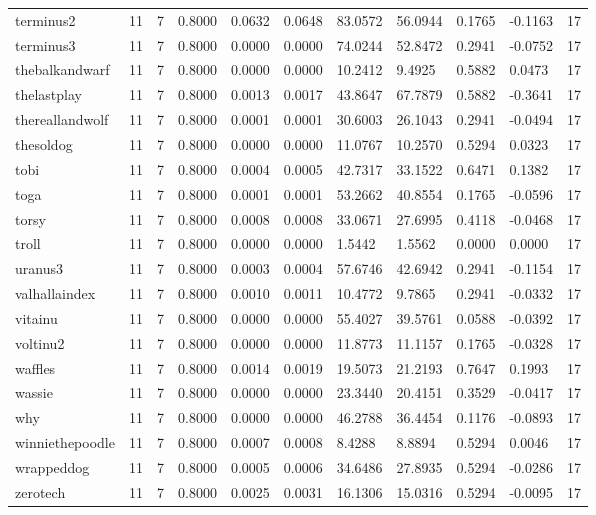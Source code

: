 \begin{table}[htbp]
\begin{tabular}{lllllllllll}
terminus2 & 11 & 7 & 0.8000 & 0.0632 & 0.0648 & 83.0572 & 56.0944 & 0.1765 & -0.1163 & 17 \\
terminus3 & 11 & 7 & 0.8000 & 0.0000 & 0.0000 & 74.0244 & 52.8472 & 0.2941 & -0.0752 & 17 \\
thebalkandwarf & 11 & 7 & 0.8000 & 0.0000 & 0.0000 & 10.2412 & 9.4925 & 0.5882 & 0.0473 & 17 \\
thelastplay & 11 & 7 & 0.8000 & 0.0013 & 0.0017 & 43.8647 & 67.7879 & 0.5882 & -0.3641 & 17 \\
thereallandwolf & 11 & 7 & 0.8000 & 0.0001 & 0.0001 & 30.6003 & 26.1043 & 0.2941 & -0.0494 & 17 \\
thesoldog & 11 & 7 & 0.8000 & 0.0000 & 0.0000 & 11.0767 & 10.2570 & 0.5294 & 0.0323 & 17 \\
tobi & 11 & 7 & 0.8000 & 0.0004 & 0.0005 & 42.7317 & 33.1522 & 0.6471 & 0.1382 & 17 \\
toga & 11 & 7 & 0.8000 & 0.0001 & 0.0001 & 53.2662 & 40.8554 & 0.1765 & -0.0596 & 17 \\
torsy & 11 & 7 & 0.8000 & 0.0008 & 0.0008 & 33.0671 & 27.6995 & 0.4118 & -0.0468 & 17 \\
troll & 11 & 7 & 0.8000 & 0.0000 & 0.0000 & 1.5442 & 1.5562 & 0.0000 & 0.0000 & 17 \\
uranus3 & 11 & 7 & 0.8000 & 0.0003 & 0.0004 & 57.6746 & 42.6942 & 0.2941 & -0.1154 & 17 \\
valhallaindex & 11 & 7 & 0.8000 & 0.0010 & 0.0011 & 10.4772 & 9.7865 & 0.2941 & -0.0332 & 17 \\
vitainu & 11 & 7 & 0.8000 & 0.0000 & 0.0000 & 55.4027 & 39.5761 & 0.0588 & -0.0392 & 17 \\
voltinu2 & 11 & 7 & 0.8000 & 0.0000 & 0.0000 & 11.8773 & 11.1157 & 0.1765 & -0.0328 & 17 \\
waffles & 11 & 7 & 0.8000 & 0.0014 & 0.0019 & 19.5073 & 21.2193 & 0.7647 & 0.1993 & 17 \\
wassie & 11 & 7 & 0.8000 & 0.0000 & 0.0000 & 23.3440 & 20.4151 & 0.3529 & -0.0417 & 17 \\
why & 11 & 7 & 0.8000 & 0.0000 & 0.0000 & 46.2788 & 36.4454 & 0.1176 & -0.0893 & 17 \\
winniethepoodle & 11 & 7 & 0.8000 & 0.0007 & 0.0008 & 8.4288 & 8.8894 & 0.5294 & 0.0046 & 17 \\
wrappeddog & 11 & 7 & 0.8000 & 0.0005 & 0.0006 & 34.6486 & 27.8935 & 0.5294 & -0.0286 & 17 \\
zerotech & 11 & 7 & 0.8000 & 0.0025 & 0.0031 & 16.1306 & 15.0316 & 0.5294 & -0.0095 & 17 \\

\end{tabular}
\end{table}
